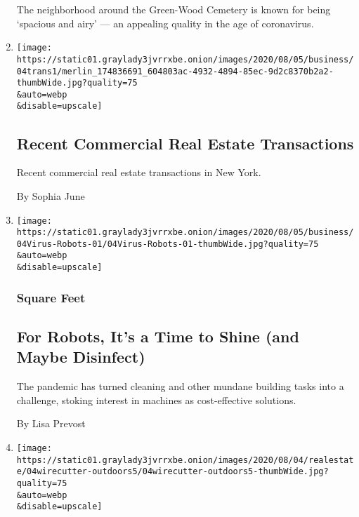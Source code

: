 \begin{enumerate}
  The neighborhood around the Green-Wood Cemetery is known for being
  `spacious and airy' --- an appealing quality in the age of
  coronavirus.
\item
  \href{/2020/08/04/business/recent-commercial-real-estate-transactions.html}{}

  \texttt{[image: https://static01.graylady3jvrrxbe.onion/images/2020/08/05/business/04trans1/merlin\_174836691\_604803ac-4932-4894-85ec-9d2c8370b2a2-thumbWide.jpg?quality=75\\\&auto=webp\\\&disable=upscale]}

  \hypertarget{recent-commercial-real-estate-transactions}{%
  \subsection{Recent Commercial Real Estate
  Transactions}\label{recent-commercial-real-estate-transactions}}

  Recent commercial real estate transactions in New York.

  By Sophia June
\item
  \href{/2020/08/04/business/robot-cleaning-coronavirus.html}{}

  \texttt{[image: https://static01.graylady3jvrrxbe.onion/images/2020/08/05/business/04Virus-Robots-01/04Virus-Robots-01-thumbWide.jpg?quality=75\\\&auto=webp\\\&disable=upscale]}

  \hypertarget{square-feet}{%
  \subsubsection{Square Feet}\label{square-feet}}

  \hypertarget{for-robots-its-a-time-to-shine-and-maybe-disinfect}{%
  \subsection{For Robots, It's a Time to Shine (and Maybe
  Disinfect)}\label{for-robots-its-a-time-to-shine-and-maybe-disinfect}}

  The pandemic has turned cleaning and other mundane building tasks into
  a challenge, stoking interest in machines as cost-effective solutions.

  By Lisa Prevost
\item
  \href{/2020/08/04/realestate/upgrade-your-outdoor-space.html}{}

  \texttt{[image: https://static01.graylady3jvrrxbe.onion/images/2020/08/04/realestate/04wirecutter-outdoors5/04wirecutter-outdoors5-thumbWide.jpg?quality=75\\\&auto=webp\\\&disable=upscale]}


\end{enumerate}
